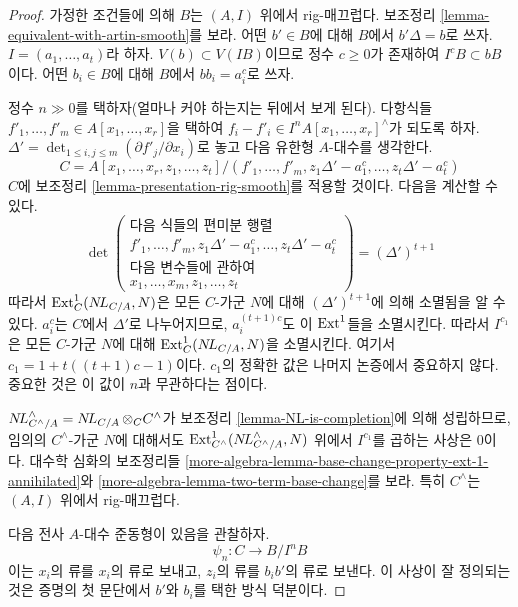 \begin{proof}
가정한 조건들에 의해 $B$는 $(A, I)$ 위에서 rig-매끄럽다.
보조정리 \ref{lemma-equivalent-with-artin-smooth}를 보라.
어떤 $b' \in B$에 대해 $B$에서 $b' \Delta = b$로 쓰자.
$I = (a_1, \ldots, a_t)$라 하자.
$V(b) \subset V(IB)$이므로 정수 $c \geq 0$가 존재하여 $I^cB \subset bB$이다.
어떤 $b_i \in B$에 대해 $B$에서 $bb_i = a_i^c$로 쓰자.

\medskip\noindent
정수 $n \gg 0$를 택하자(얼마나 커야 하는지는 뒤에서 보게 된다).
다항식들 $f'_1, \ldots, f'_m \in A[x_1, \ldots, x_r]$을 택하여
$f_i - f'_i \in I^nA[x_1, \ldots, x_r]^\wedge$가 되도록 하자.
$\Delta' = \det_{1 \leq i, j \leq m}(\partial f'_j/\partial x_i)$로 놓고
다음 유한형 $A$-대수를 생각한다.
$$
C = A[x_1, \ldots, x_r, z_1, \ldots, z_t]/
(f'_1, \ldots, f'_m,
z_1\Delta' - a_1^c, \ldots, z_t\Delta' - a_t^c)
$$
$C$에 보조정리 \ref{lemma-presentation-rig-smooth}를 적용할 것이다.
다음을 계산할 수 있다.
$$
\det\left(
\begin{matrix}
\text{다음 식들의 편미분 행렬} \\
f'_1, \ldots, f'_m, z_1\Delta' - a_1^c, \ldots, z_t\Delta' - a_t^c \\
\text{다음 변수들에 관하여} \\
x_1, \ldots, x_m, z_1, \ldots, z_t
\end{matrix}
\right) =
(\Delta')^{t + 1}
$$
따라서 $\mathop{\mathrm{Ext}}\nolimits^1_C(\mathop{N\!L}\nolimits_{C/A}, N)$은 모든 $C$-가군 $N$에 대해
$(\Delta')^{t + 1}$에 의해 소멸됨을 알 수 있다.
$a_i^c$는 $C$에서 $\Delta'$로 나누어지므로,
$a_i^{(t + 1)c}$도 이 $\mathop{\mathrm{Ext}}\nolimits^1$들을 소멸시킨다.
따라서 $I^{c_1}$은 모든 $C$-가군 $N$에 대해 $\mathop{\mathrm{Ext}}\nolimits^1_C(\mathop{N\!L}\nolimits_{C/A}, N)$을 소멸시킨다.
여기서 $c_1 = 1 + t((t + 1)c - 1)$이다.
$c_1$의 정확한 값은 나머지 논증에서 중요하지 않다.
중요한 것은 이 값이 $n$과 무관하다는 점이다.

\medskip\noindent
$\mathop{N\!L}\nolimits_{C^\wedge/A}^\wedge = \mathop{N\!L}\nolimits_{C/A} \otimes_C C^\wedge$가
보조정리 \ref{lemma-NL-is-completion}에 의해 성립하므로,
임의의 $C^\wedge$-가군 $N$에 대해서도
$\mathop{\mathrm{Ext}}\nolimits^1_{C^\wedge}(\mathop{N\!L}\nolimits_{C^\wedge/A}^\wedge, N)$ 위에서 $I^{c_1}$를 곱하는 사상은 0이다.
대수학 심화의 보조정리들
\ref{more-algebra-lemma-base-change-property-ext-1-annihilated}와
\ref{more-algebra-lemma-two-term-base-change}를 보라.
특히 $C^\wedge$는 $(A, I)$ 위에서 rig-매끄럽다.

\medskip\noindent
다음 전사 $A$-대수 준동형이 있음을 관찰하자.
$$
\psi_n : C \longrightarrow B/I^nB
$$
이는 $x_i$의 류를 $x_i$의 류로 보내고,
$z_i$의 류를 $b_ib'$의 류로 보낸다.
이 사상이 잘 정의되는 것은 증명의 첫 문단에서 $b'$와 $b_i$를 택한 방식 덕분이다.


\end{proof}
